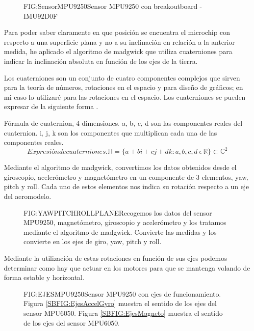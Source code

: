 \begin{figure}[Sensor MPU9250]{FIG:SensorMPU9250}{Sensor MPU9250 con breakoutboard - IMU92D0F}
\end{figure}
 
 Para poder saber claramente en que posición se encuentra el microchip con respecto a una superficie plana y no a su inclinación en relación a la anterior medida, he aplicado el algoritmo de madgwick\cite{Act2012} que utiliza cuaterniones para indicar la inclinación absoluta en función de los ejes de la tierra. 
 
 Los cuaterniones son un conjunto de cuatro componentes complejos que sirven para la teoría de números, rotaciones en el espacio y para diseño de gráficos; en mi caso lo utilizaré para las rotaciones en el espacio. Los cuaterniones se pueden expresar de la siguiente forma \cite{Graves1999}.
 
{Fórmula de cuaternion, 4 dimensiones. a, b, c, d son las componentes reales del cuaternion. i, j, k  son los componentes que multiplican cada una de las componentes reales.}
\begin{equation}[EQ:CuaternionFormula]{Expresión de cuaterniones.}
	\boxed{\mathbb{H}= \{ {a+bi+cj+dk:a,b,c,d\:\epsilon\:\mathbb{R}} \} \subset  \mathbb{C}^{2}}
	\end{equation}

   Mediante el algoritmo de madgwick, convertimos los datos obtenidos desde el giroscopio, acelerómetro y magnetómetro en un componente de 3 elementos, yaw, pitch y roll.
   Cada uno de estos elementos nos indica su rotación respecto a un eje del aeromodelo. 
 

\begin{figure}[Ejes yaw, pitch y roll]{FIG:YAWPITCHROLLPLANE}{Recogemos los datos del sensor MPU9250, magnetómetro, giroscopio y acelerómetro y los tratamos mediante el algoritmo de madgwick. Convierte las medidas y los convierte en los ejes de giro, yaw, pitch y roll.}
\end{figure}
 
 Mediante la utilización de estas rotaciones en función de sus ejes podemos determinar como hay que actuar en los motores para que se mantenga volando de forma estable y horizontal.
  

\begin{figure}[Ejes MPU9250]{FIG:EJESMPU9250}{Sensor MPU9250 con ejes de funcionamiento. Figura \ref{SBFIG:EjesAccelGyro} muestra el sentido de los ejes del sensor MPU6050. Figura \ref{SBFIG:EjesMagneto} muestra el sentido de los ejes del sensor MPU6050.}
   \quad
\end{figure} 

